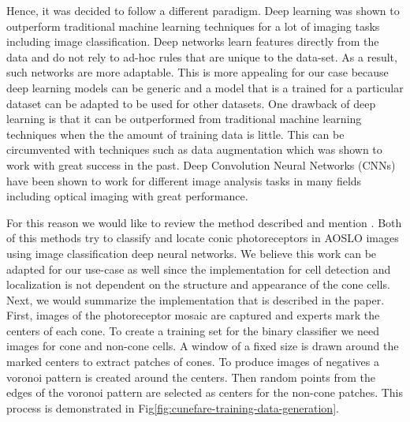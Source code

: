 \documentclass[]{article}
\begin{document}
Hence, it was decided to follow a different paradigm.
Deep learning was shown to outperform traditional machine learning techniques for 
a lot of imaging tasks including image classification.
Deep networks learn features directly from the data and do not rely to ad-hoc rules
that are unique to the data-set.
As a result, such networks are more adaptable.
This is more appealing for our case because deep learning models can be
generic and a model that is a trained for a particular dataset can be
adapted  to be used for other datasets.
One drawback of deep learning is that it can be outperformed from traditional machine learning techniques when the the amount of training data is little.
This can be circumvented with techniques such as data augmentation\cite{perez_effectiveness_2017} which was shown to work with great success in the past\cite{ronneberger_u-net_2015}.
Deep Convolution Neural Networks (CNNs) have been shown to work for different image analysis tasks in many fields including optical imaging\cite{gulshan_development_2016, perez_effectiveness_2017, li_cross-modality_2016, fu_retinal_2016, fang} with great performance.

For this reason we would like to review the method described \cite{cunefare_open_2017} and mention \cite{cunefare_deep_2018}.
Both of this methods try to classify and locate conic photoreceptors in
AOSLO images using image classification deep neural networks.
We believe this work can be adapted for our use-case as well since
the implementation for cell detection and localization is not dependent on the structure and appearance of the cone cells.
Next, we would summarize the implementation that is described in the paper.
First, images of the photoreceptor mosaic are captured and experts mark the centers of each cone.
To create a training set for the binary classifier we need images for cone and non-cone cells.
A window of a fixed size is drawn around the marked centers to extract patches of cones.
To produce images of negatives a voronoi pattern is created around the centers.
Then random points from the edges of the voronoi pattern are selected as centers for the non-cone patches.
This process is demonstrated in Fig\ref{fig:cunefare-training-data-generation}.
\end{document}
